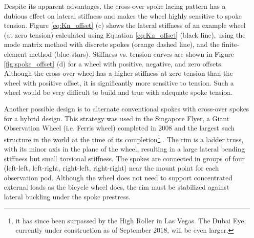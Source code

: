 \documentclass[\rootdir/thesis.tex]{subfiles}
\begin{document}
Despite its apparent advantages, the cross-over spoke lacing pattern has a dubious effect on lateral stiffness and makes the wheel highly sensitive to spoke tension. Figure \ref{eq:Kn_offset} (c) shows the lateral stiffness of an example wheel  (at zero tension) calculated using Equation \eqref{eq:Kn_offset} (black line), using the mode matrix method with discrete spokes (orange dashed line), and the finite-element method (blue stars). Stiffness vs. tension curves are shown in Figure \ref{fig:spoke_offset} (d) for a wheel with positive, negative, and zero offsets. Although the cross-over wheel has a higher stiffness at zero tension than the wheel with positive offset, it is significantly more sensitive to tension. Such a wheel would be very difficult to build and true with adequate spoke tension.

Another possible design is to alternate conventional spokes with cross-over spokes for a hybrid design. This strategy was used in the Singapore Flyer, a Giant Observation Wheel (i.e. Ferris wheel) completed in 2008 and the largest such structure in the world at the time of its completion\footnote{it has since been surpassed by the High Roller in Las Vegas. The Dubai Eye, currently under construction as of September 2018, will be even larger.} \cite{Allsop2009}. The rim is a ladder truss, with its minor axis in the plane of the wheel, resulting in a large lateral bending stiffness but small torsional stiffness. The spokes are connected in groups of four (left-left, left-right, right-left, right-right) near the mount point for each observation pod. Although the wheel does not need to support concentrated external loads as the bicycle wheel does, the rim must be stabilized against lateral buckling under the spoke prestress.


\end{document}
